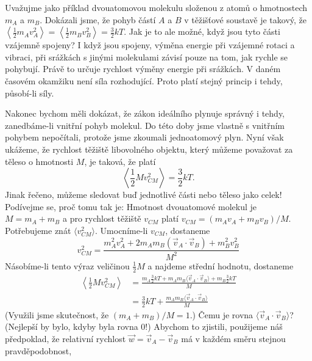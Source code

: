     Uvažujme jako příklad dvouatomovou molekulu složenou z atomů o hmotnostech \(m_A\) a \(m_B\).
    Dokázali jsme, že pohyb částí \(A\) a \(B\) v těžišťové soustavě je takový, že
    \(\left\langle\frac{1}{2}m_Av^2_A\right\rangle=\left\langle\frac{1}{2}m_Bv^2_B\right\rangle =
    \frac{3}{2}kT\). Jak je to ale možné, když jsou tyto části vzájemně spojeny? I když jsou
    spojeny, výměna energie při vzájemné rotaci a vibraci, při srážkách s jinými molekulami závisí
    pouze na tom, jak rychle se pohybují. Právě to určuje rychlost výměny energie při srážkách. V
    daném časovém okamžiku není síla rozhodující. Proto platí stejný princip i tehdy, působí-li
    síly.

    Nakonec bychom měli dokázat, že zákon ideálního plynuje správný i tehdy, zanedbáme-li vnitřní
    pohyb molekul. Do této doby jsme vlastně s vnitřním pohybem nepočítali, protože jsme zkoumali
    jednoatomový plyn. Nyní však ukážeme, že rychlost těžiště libovolného objektu, který můžeme
    považovat za těleso o hmotnosti \(M\), je taková, že platí
    \begin{equation}\label{fyz:eq634}
      \left\langle\frac{1}{2}Mv^2_{CM}\right\rangle = \frac{3}{2}kT.
    \end{equation}
    Jinak řečeno, můžeme sledovat buď jednotlivé části nebo těleso jako celek! Podívejme se, proč
    tomu tak je: Hmotnost dvouatomové molekul je \(M = m_A + m_B\) a pro rychlost těžiště \(v_{CM}\)
    platí \(v_{CM} = (m_Av_A + m_Bv_B)/M\). Potřebujeme znát \(⟨v^2_{CM}⟩\). Umocníme-li \(v_{CM}\),
    dostaneme
    \begin{equation}\label{fyz:eq635}
      v^2_{CM} = \frac{m^2_Av^2_A+2m_Am_B(\vec{v}_A\cdot\vec{v}_B)+m^2_Bv^2_B}{M^2}
    \end{equation}
    Násobíme-li tento výraz veličinou \(\frac{1}{2}M\) a najdeme střední hodnotu, dostaneme
    \begin{align}
      \left\langle\frac{1}{2}Mv^2_{CM}\right\rangle
        &= \frac{m_A\frac{3}{2}kT + m_Am_B⟨\vec{v}_A\cdot\vec{v}_B⟩ + m_B\frac{3}{2}kT}{M}\nonumber\\
        &= \frac{3}{2}kT + \frac{m_Am_B⟨\vec{v}_A\cdot\vec{v}_B⟩}{M}                \label{fyz:eq636}
    \end{align}
    (Využili jsme skutečnost, že \((m_A + m_B)/M=1\).) Čemu je rovna  \(⟨\vec{v}_A\cdot\vec{v}_B⟩\)?
    (Nejlepší by bylo, kdyby byla rovna 0!) Abychom to zjistili, použijeme náš předpoklad, že
    relativní rychlost \(\vec{w} = \vec{v}_A-\vec{v}_B\) má v každém směru stejnou pravděpodobnost,
